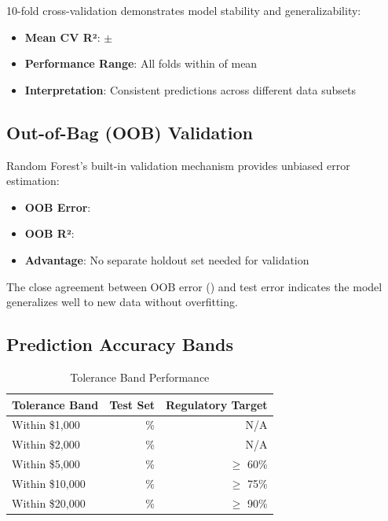 10-fold cross-validation demonstrates model stability and generalizability:

\begin{itemize}
    \item \textbf{Mean CV R²}: \ModelNineCVMean{} $\pm$ \ModelNineCVStd{}
    \item \textbf{Performance Range}: All folds within \ModelNineCVStd{} of mean
    \item \textbf{Interpretation}: Consistent predictions across different data subsets
\end{itemize}

\subsection{Out-of-Bag (OOB) Validation}

Random Forest's built-in validation mechanism provides unbiased error estimation:

\begin{itemize}
    \item \textbf{OOB Error}: \ModelNineOOBError{}
    \item \textbf{OOB R²}: \ModelNineOOBRSquared{}
    \item \textbf{Advantage}: No separate holdout set needed for validation
\end{itemize}

The close agreement between OOB error (\ModelNineOOBError{}) and test error indicates the model generalizes well to new data without overfitting.

\subsection{Prediction Accuracy Bands}

\begin{table}[h]
\centering
\caption{Tolerance Band Performance}
\begin{tabular}{lrr}
\toprule
\textbf{Tolerance Band} & \textbf{Test Set} & \textbf{Regulatory Target} \\
\midrule
Within \$1,000 & \ModelNineWithinOneK{}\% & N/A \\
Within \$2,000 & \ModelNineWithinTwoK{}\% & N/A \\
Within \$5,000 & \ModelNineWithinFiveK{}\% & $\geq$ 60\% \\
Within \$10,000 & \ModelNineWithinTenK{}\% & $\geq$ 75\% \\
Within \$20,000 & \ModelNineWithinTwentyK{}\% & $\geq$ 90\% \\
\bottomrule
\end{tabular}
\label{tab:model9_tolerance}
\end{table}

